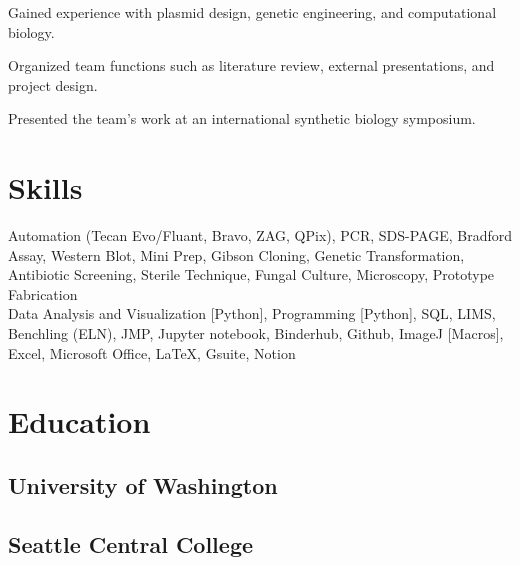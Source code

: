 \documentclass[]{forrest-resume-interfont}
\begin{document}
\begin{tightemize}
    \item Gained experience with plasmid design, genetic engineering, and computational biology.
    \item Organized team functions such as literature review, external presentations, and project design.
    \item Presented the team's work at an international synthetic biology symposium.
\end{tightemize}

\linesep

\section{ Skills}
Automation (Tecan Evo/Fluant, Bravo, ZAG, QPix),
PCR, 
SDS-PAGE,
Bradford Assay,
Western Blot,
Mini Prep, 
Gibson Cloning,
Genetic Transformation,
Antibiotic Screening,
Sterile Technique, 
Fungal Culture, 
Microscopy, 
Prototype Fabrication
\\
\spacesep
{} %
Data Analysis and Visualization [Python],
Programming [Python],
SQL,
LIMS,
Benchling (ELN),
JMP,
Jupyter notebook,
Binderhub,
Github,
ImageJ [Macros],
Excel,
Microsoft Office,
LaTeX,
Gsuite,
Notion

\linesep


\section{ Education}
\subsection{University of Washington}
\spacesep
\subsection{Seattle Central College}

\vfill

\noindent\makebox[\linewidth]{\color{black}\rule{\paperwidth}{0.4pt}}
\end{document}
